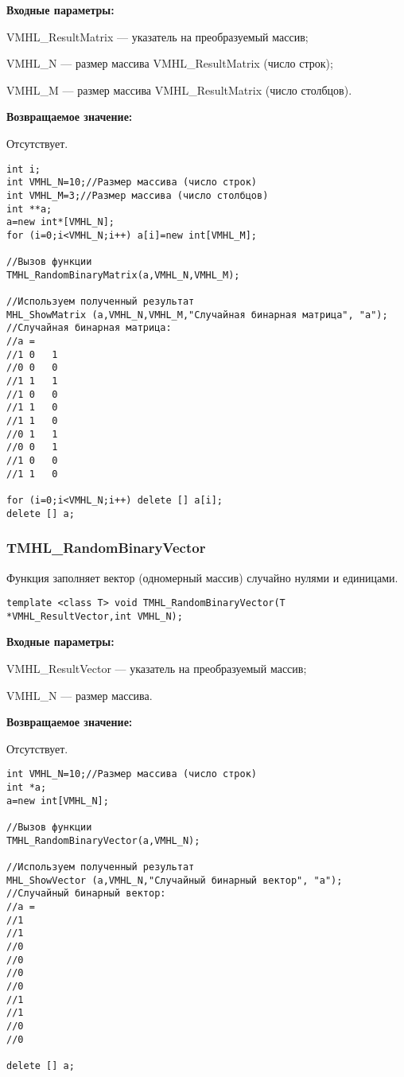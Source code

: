\documentclass[a4paper,12pt]{article}
\begin{document}
\textbf{Входные параметры:}
 
VMHL\_ResultMatrix --- указатель на преобразуемый массив;
 
VMHL\_N --- размер массива VMHL\_ResultMatrix (число строк);
 
VMHL\_M --- размер массива VMHL\_ResultMatrix (число столбцов). 

\textbf{Возвращаемое значение:}

Отсутствует.


\begin{lstlisting}[label=code_use_TMHL_RandomBinaryMatrix,caption=Пример использования]
int i;
int VMHL_N=10;//Размер массива (число строк)
int VMHL_M=3;//Размер массива (число столбцов)
int **a;
a=new int*[VMHL_N];
for (i=0;i<VMHL_N;i++) a[i]=new int[VMHL_M];

//Вызов функции
TMHL_RandomBinaryMatrix(a,VMHL_N,VMHL_M);

//Используем полученный результат
MHL_ShowMatrix (a,VMHL_N,VMHL_M,"Случайная бинарная матрица", "a");
//Случайная бинарная матрица:
//a =
//1	0	1
//0	0	0
//1	1	1
//1	0	0
//1	1	0
//1	1	0
//0	1	1
//0	0	1
//1	0	0
//1	1	0

for (i=0;i<VMHL_N;i++) delete [] a[i];
delete [] a;
\end{lstlisting}

\subsubsection{TMHL\_RandomBinaryVector}\label{TMHL_RandomBinaryVector}

Функция заполняет вектор (одномерный массив) случайно нулями и единицами.


\begin{lstlisting}[label=code_syntax_TMHL_RandomBinaryVector,caption=Синтаксис]
template <class T> void TMHL_RandomBinaryVector(T *VMHL_ResultVector,int VMHL_N);
\end{lstlisting}

\textbf{Входные параметры:}
 
VMHL\_ResultVector --- указатель на преобразуемый массив;
 
VMHL\_N --- размер массива.

\textbf{Возвращаемое значение:}

Отсутствует.


\begin{lstlisting}[label=code_use_TMHL_RandomBinaryVector,caption=Пример использования]
int VMHL_N=10;//Размер массива (число строк)
int *a;
a=new int[VMHL_N];

//Вызов функции
TMHL_RandomBinaryVector(a,VMHL_N);

//Используем полученный результат
MHL_ShowVector (a,VMHL_N,"Случайный бинарный вектор", "a");
//Случайный бинарный вектор:
//a =
//1
//1
//0
//0
//0
//0
//1
//1
//0
//0

delete [] a;
\end{lstlisting}
\end{document}
